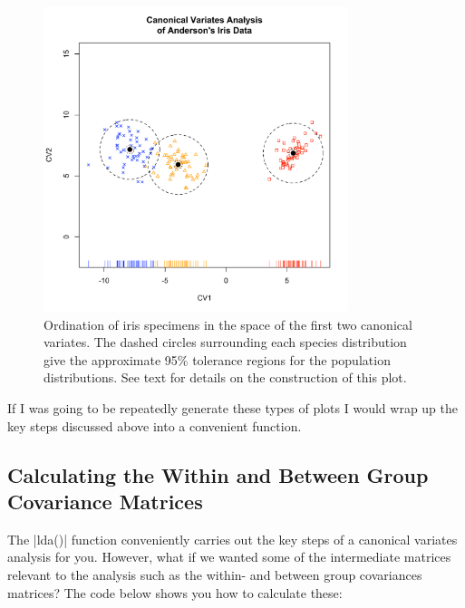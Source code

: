 \begin{figure}
\begin{center}
\includegraphics[height=3.5in]{iris-cva-fancy}
\end{center}
\caption{Ordination of iris specimens in the space of the first two canonical variates.  The dashed circles surrounding each species distribution give the approximate 95\% tolerance regions for the population distributions. See text for details on the construction of this plot.}
\end{figure}

If I was going to be repeatedly generate these types of plots I would wrap up the key steps discussed above into a convenient function.


\subsection*{Calculating the Within and Between Group Covariance Matrices}

The |lda()| function conveniently carries out the key steps of a canonical variates analysis for you.  However, what if we wanted some of the intermediate matrices relevant to the analysis such as the within- and between group covariances matrices? The code below shows you how to calculate these:


